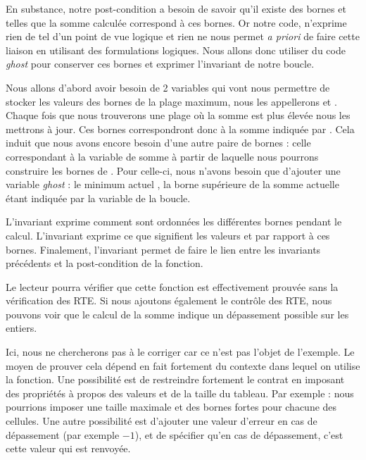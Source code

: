 En substance, notre post-condition a besoin de savoir qu'il existe des
bornes  et  telles que la somme calculée correspond à ces bornes.
Or notre code, n'exprime rien de tel d'un point de vue logique et rien ne nous
permet \textit{a priori} de faire cette liaison en utilisant des formulations logiques.
Nous allons donc utiliser du code \textit{ghost} pour conserver ces bornes et exprimer
l'invariant de notre boucle.



Nous allons d'abord avoir besoin de 2 variables qui vont nous permettre de stocker
les valeurs des bornes de la plage maximum, nous les appellerons 
et . Chaque fois que nous trouverons une plage où la somme est plus
élevée nous les mettrons à jour. Ces bornes correspondront donc à la somme indiquée
par . Cela induit que nous avons encore besoin d'une autre paire de
bornes : celle correspondant à la variable de somme  à partir de laquelle
nous pourrons construire les bornes de . Pour celle-ci, nous n'avons
besoin que d'ajouter une variable \textit{ghost} : le minimum actuel , la
borne supérieure de la somme actuelle étant indiquée par la variable  de la
boucle.






L'invariant  exprime comment sont ordonnées les différentes bornes
pendant le calcul. L'invariant  exprime ce que signifient les
valeurs  et  par rapport à ces bornes. Finalement,
l'invariant  permet de faire le lien entre les invariants précédents
et la post-condition de la fonction.



Le lecteur pourra vérifier que cette fonction est effectivement prouvée sans la
vérification des RTE. Si nous ajoutons également le contrôle des RTE, nous pouvons
voir que le calcul de la somme indique un dépassement possible sur les entiers.



Ici, nous ne chercherons pas à le corriger car ce n'est pas l'objet de l'exemple.
Le moyen de prouver cela dépend en fait fortement du contexte dans lequel on
utilise la fonction. Une possibilité est de restreindre fortement le contrat en
imposant des propriétés à propos des valeurs et de la taille du tableau. Par
exemple : nous pourrions imposer une taille maximale et des bornes fortes pour
chacune des cellules. Une autre possibilité est d'ajouter une valeur d'erreur
en cas de dépassement (par exemple $-1$), et de spécifier qu'en cas de
dépassement, c'est cette valeur qui est renvoyée.



